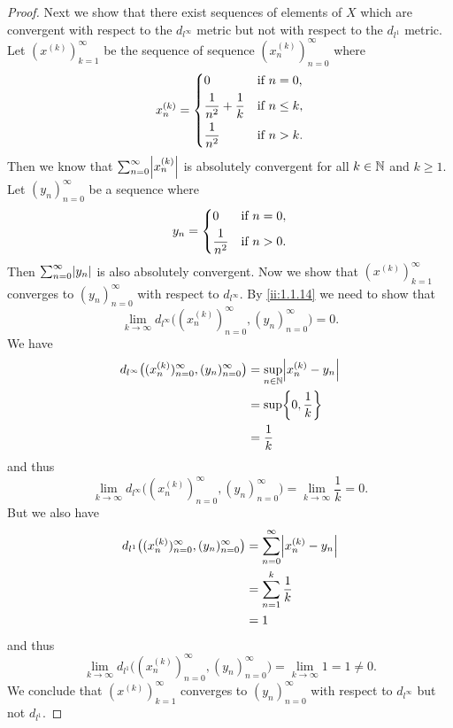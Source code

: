 \begin{proof}
  Next we show that there exist sequences of elements of \(X\) which are convergent with respect to the \(d_{l^\infty}\) metric but not with respect to the \(d_{l^1}\) metric.
  Let \((x^{(k)})_{k = 1}^\infty\) be the sequence of sequence \((x_n^{(k)})_{n = 0}^\infty\) where
  \[
    x_n^{(k)} = \begin{dcases}
      0                             & \text{if } n = 0,    \\
      \dfrac{1}{n^2} + \dfrac{1}{k} & \text{if } n \leq k, \\
      \dfrac{1}{n^2}                & \text{if } n > k.
    \end{dcases}
  \]
  Then we know that \(\sum_{n = 0}^\infty \abs{x_n^{(k)}}\) is absolutely convergent for all \(k \in \mathbb{N}\) and \(k \geq 1\).
  Let \((y_n)_{n = 0}^\infty\) be a sequence where
  \[
    y_n = \begin{dcases}
      0              & \text{if } n = 0, \\
      \dfrac{1}{n^2} & \text{if } n > 0.
    \end{dcases}
  \]
  Then \(\sum_{n = 0}^\infty \abs{y_n}\) is also absolutely convergent.
  Now we show that \((x^{(k)})_{k = 1}^\infty\) converges to \((y_n)_{n = 0}^\infty\) with respect to \(d_{l^\infty}\).
  By \cref{ii:1.1.14} we need to show that
  \[
    \lim_{k \to \infty} d_{l^\infty}\big((x_n^{(k)})_{n = 0}^\infty, (y_n)_{n = 0}^\infty\big) = 0.
  \]
  We have
  \begin{align*}
    d_{l^\infty}\big((x_n^{(k)})_{n = 0}^\infty, (y_n)_{n = 0}^\infty\big) & = \sup_{n \in \N} \abs{x_n^{(k)} - y_n} \\
                                                                           & = \sup \set{0, \dfrac{1}{k}}            \\
                                                                           & = \dfrac{1}{k}
  \end{align*}
  and thus
  \[
    \lim_{k \to \infty} d_{l^\infty}\big((x_n^{(k)})_{n = 0}^\infty, (y_n)_{n = 0}^\infty\big) = \lim_{k \to \infty} \dfrac{1}{k} = 0.
  \]
  But we also have
  \begin{align*}
    d_{l^1}\big((x_n^{(k)})_{n = 0}^\infty, (y_n)_{n = 0}^\infty\big) & = \sum_{n = 0}^\infty \abs{x_n^{(k)} - y_n} \\
                                                                      & = \sum_{n = 1}^k \dfrac{1}{k}               \\
                                                                      & = 1
  \end{align*}
  and thus
  \[
    \lim_{k \to \infty} d_{l^1}\big((x_n^{(k)})_{n = 0}^\infty, (y_n)_{n = 0}^\infty\big) = \lim_{k \to \infty} 1 = 1 \neq 0.
  \]
  We conclude that \((x^{(k)})_{k = 1}^\infty\) converges to \((y_n)_{n = 0}^\infty\) with respect to \(d_{l^\infty}\) but not \(d_{l^1}\).


\end{proof}
